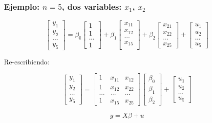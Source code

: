 \documentclass{beamer}
\begin{document}
\begin{frame}
\frametitle{Ejemplo: $n=5$, dos variables: $x_1$, $x_2$}

\[
\begin{bmatrix}
y_1 \\
y_2 \\
\hdots \\
y_5
\end{bmatrix}
= 
\beta_0
\begin{bmatrix}
1 \\
1 \\
\hdots \\
1
\end{bmatrix}
+
\beta_1
\begin{bmatrix}
x_{11} \\
x_{12}\\
\hdots\\
x_{15}\\
\end{bmatrix}
+
\beta_2
\begin{bmatrix}
x_{21} \\
x_{22} \\
\hdots \\
x_{25}
\end{bmatrix}
+
\begin{bmatrix}
u_1 \\
u_2 \\
\hdots \\
u_5
\end{bmatrix}
\]

Re-escribiendo:

\[
\begin{bmatrix}
y_1 \\
y_2 \\
\hdots \\
y_5
\end{bmatrix}
=
\begin{bmatrix}
1 & x_{11} & x_{12} \\
1 & x_{12} & x_{22} \\
\hdots & \hdots & \hdots \\
1 & x_{15} & x_{25}
\end{bmatrix}
\begin{bmatrix}
\beta_0 \\
\beta_1 \\
\beta_2
\end{bmatrix}
+
\begin{bmatrix}
u_1 \\
u_2 \\
\hdots \\
u_5
\end{bmatrix}
\]

\[ y = X\beta + u \]

\end{frame}
\end{document}
